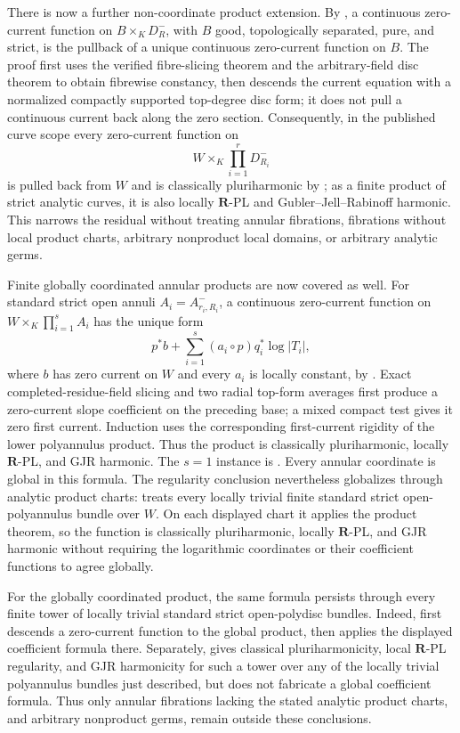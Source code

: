 There is now a further non-coordinate product extension.  By
, a continuous zero-current function on
\(B\times_KD_R^-\), with \(B\) good, topologically separated, pure, and
strict, is the pullback of a unique continuous zero-current function on
\(B\).  The proof first uses the verified fibre-slicing theorem and the
arbitrary-field disc theorem to obtain fibrewise constancy, then descends
the current equation with a normalized compactly supported top-degree disc
form; it does not pull a continuous current back along the zero section.
Consequently, in the published curve scope every zero-current function on
\[
                         W\times_K\prod_{i=1}^rD_{R_i}^-
\]
is pulled back from \(W\) and is classically pluriharmonic by
; as a finite product of
strict analytic curves, it is also locally \(\mathbf R\)-PL and
Gubler--Jell--Rabinoff harmonic.  This narrows the residual without treating
annular fibrations, fibrations without local product charts, arbitrary
nonproduct local domains, or arbitrary analytic germs.

Finite globally coordinated annular products are now covered as well.  For
standard strict open annuli \(A_i=A^-_{r_i,R_i}\), a continuous zero-current
function on \(W\times_K\prod_{i=1}^sA_i\) has the unique form
\[
 p^*b+\sum_{i=1}^s(a_i\circ p)q_i^*\log|T_i|,
\]
where \(b\) has zero current on \(W\) and every \(a_i\) is locally constant,
by .  Exact
completed-residue-field slicing and two radial top-form averages first
produce a zero-current slope coefficient on the preceding base; a mixed
compact test gives it zero first current.  Induction uses the corresponding
first-current rigidity of the lower polyannulus product.  Thus the product
is classically pluriharmonic, locally \(\mathbf R\)-PL, and GJR harmonic.
The \(s=1\) instance is
.  Every annular coordinate
is global in this formula.  The regularity conclusion nevertheless
globalizes through analytic product charts:
 treats every locally
trivial finite standard strict open-polyannulus bundle over \(W\).  On each
displayed chart it applies the product theorem, so the function is
classically pluriharmonic, locally \(\mathbf R\)-PL, and GJR harmonic without
requiring the logarithmic coordinates or their coefficient functions to
agree globally.

For the globally coordinated product, the same formula persists through
every finite tower of locally trivial standard strict open-polydisc bundles.
Indeed,  first descends
a zero-current function to the global product, then applies the displayed
coefficient formula there.  Separately,
 gives
classical pluriharmonicity, local \(\mathbf R\)-PL regularity, and GJR
harmonicity for such a tower over any of the locally trivial polyannulus
bundles just described, but does not fabricate a global coefficient formula.
Thus only annular fibrations lacking the stated
analytic product charts, and arbitrary nonproduct germs, remain outside
these conclusions.

